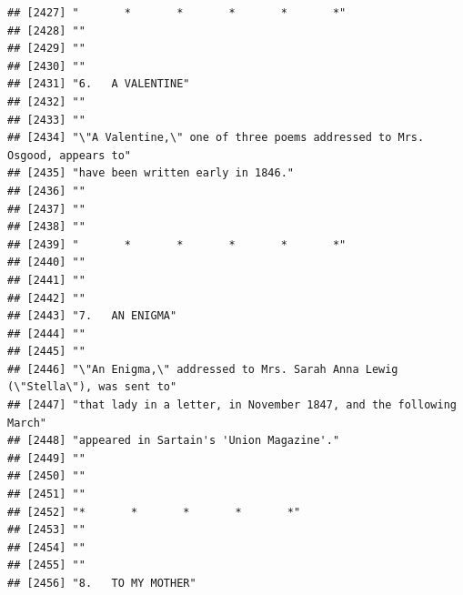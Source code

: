 \documentclass{article}\usepackage[]{graphicx}\usepackage[]{color}
\makeatletter
\newenvironment{kframe}{%
 \def\at@end@of@kframe{}%
 \ifinner\ifhmode%
  \def\at@end@of@kframe{\end{minipage}}%
  \begin{minipage}{\columnwidth}%
 \fi\fi%
 \def\FrameCommand##1{\hskip\@totalleftmargin \hskip-\fboxsep
 \colorbox{shadecolor}{##1}\hskip-\fboxsep
     \hskip-\linewidth \hskip-\@totalleftmargin \hskip\columnwidth}%
 \MakeFramed {\advance\hsize-\width
   \@totalleftmargin\z@ \linewidth\hsize
   \@setminipage}}%
 {\par\unskip\endMakeFramed%
 \at@end@of@kframe}
\newenvironment{knitrout}{}{} %
\makeatother
\begin{document}
\begin{knitrout}
\begin{kframe}
\begin{verbatim}
## [2427] "       *       *       *       *       *"                                    
## [2428] ""                                                                            
## [2429] ""                                                                            
## [2430] ""                                                                            
## [2431] "6.   A VALENTINE"                                                            
## [2432] ""                                                                            
## [2433] ""                                                                            
## [2434] "\"A Valentine,\" one of three poems addressed to Mrs. Osgood, appears to"    
## [2435] "have been written early in 1846."                                            
## [2436] ""                                                                            
## [2437] ""                                                                            
## [2438] ""                                                                            
## [2439] "       *       *       *       *       *"                                    
## [2440] ""                                                                            
## [2441] ""                                                                            
## [2442] ""                                                                            
## [2443] "7.   AN ENIGMA"                                                              
## [2444] ""                                                                            
## [2445] ""                                                                            
## [2446] "\"An Enigma,\" addressed to Mrs. Sarah Anna Lewig (\"Stella\"), was sent to" 
## [2447] "that lady in a letter, in November 1847, and the following March"            
## [2448] "appeared in Sartain's 'Union Magazine'."                                     
## [2449] ""                                                                            
## [2450] ""                                                                            
## [2451] ""                                                                            
## [2452] "*       *       *       *       *"                                           
## [2453] ""                                                                            
## [2454] ""                                                                            
## [2455] ""                                                                            
## [2456] "8.   TO MY MOTHER"                                                           

\end{verbatim}
\end{kframe}
\end{knitrout}
\end{document}
